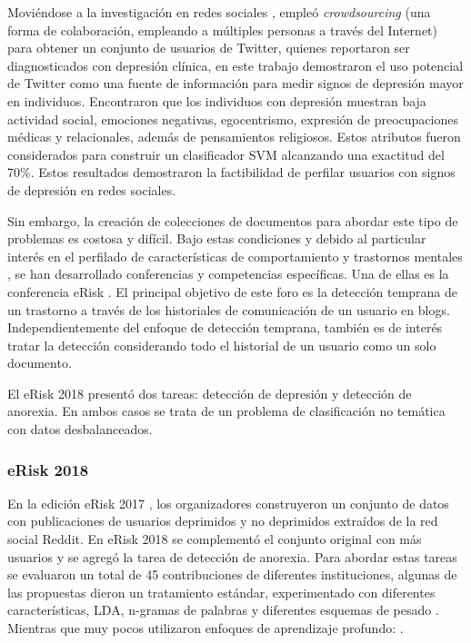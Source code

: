 Moviéndose a la investigación en redes sociales \citep{de2013predicting}, empleó \textit{crowdsourcing} (una forma de colaboración, empleando a múltiples personas a través del Internet) para obtener un conjunto de usuarios de Twitter, quienes reportaron ser diagnosticados con depresión clínica, en este trabajo demostraron el uso potencial de Twitter como una fuente de información para medir signos de depresión mayor en individuos. Encontraron que los individuos con depresión muestran baja actividad social, emociones negativas, egocentrismo, expresión de preocupaciones médicas y relacionales, además de pensamientos religiosos. Estos atributos fueron considerados para construir un clasificador SVM alcanzando una exactitud del 70\%. Estos resultados demostraron la factibilidad de perfilar usuarios con signos de depresión en redes sociales. 

Sin embargo, la creación de colecciones de documentos para abordar este tipo de problemas es costosa y difícil. Bajo estas condiciones y debido al particular interés en el perfilado de características de comportamiento \citep{kumar2018aggression} y trastornos mentales  \citep{de2013predicting}, se han desarrollado conferencias y competencias específicas.
Una de ellas es la conferencia eRisk \citep{Losada2018}. El principal objetivo de este foro es la detección temprana de un trastorno a través de los historiales de comunicación de un usuario en blogs. Independientemente del enfoque de detección temprana, también es de interés tratar la detección
considerando todo el historial de un usuario como un solo documento. 

El eRisk 2018 presentó dos tareas: detección de depresión y detección de anorexia. En ambos casos se trata de un problema de clasificación no temática con datos desbalanceados.


\subsubsection{eRisk 2018}

En la edición eRisk 2017 \citep{losada2017erisk, Losada2018}, los organizadores construyeron un conjunto de datos con publicaciones de usuarios deprimidos y no deprimidos extraídos de la red social Reddit. En eRisk 2018 se complementó el conjunto original con más usuarios y se agregó la tarea de detección de anorexia. Para abordar estas tareas se evaluaron un total de 45 contribuciones de diferentes instituciones, algunas de las propuestas dieron un tratamiento estándar, experimentado con diferentes características, LDA, n-gramas de palabras y diferentes esquemas de pesado \citep{cacheda2018analysis, almeida2017detecting, ortega2018peimex}. Mientras que muy pocos utilizaron enfoques de aprendizaje profundo: \citep{trotzek2018word, wang2018neural, liu2018tua1}.

